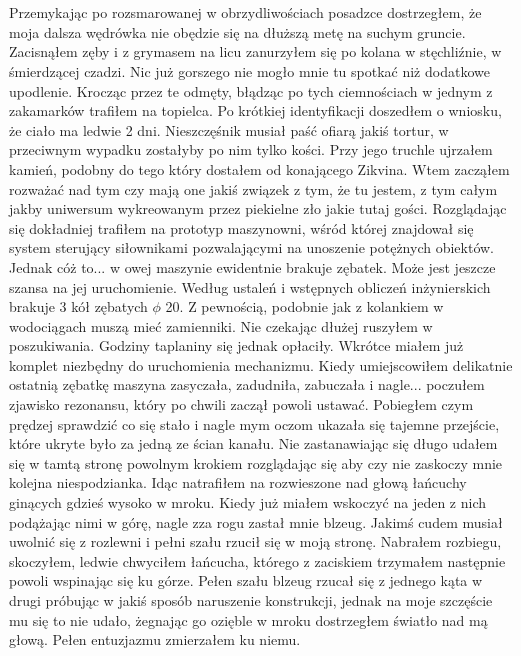 \documentclass[12pt,a4paper]{report}
\begin{document}
 \linebreak
 \\
 \\
Przemykając po rozsmarowanej w obrzydliwościach posadzce dostrzegłem, że moja dalsza wędrówka nie obędzie się na dłuższą metę na suchym gruncie. Zacisnąłem zęby i z grymasem na licu zanurzyłem się po kolana w stęchliźnie, w śmierdzącej czadzi. Nic już gorszego nie mogło mnie tu spotkać niż dodatkowe upodlenie. Krocząc przez te odmęty, błądząc po tych ciemnościach w jednym z zakamarków trafiłem na topielca. Po krótkiej identyfikacji doszedłem o wniosku, że ciało ma ledwie 2 dni. Nieszczęśnik musiał paść ofiarą jakiś tortur, w przeciwnym wypadku zostałyby po nim tylko kości. Przy jego truchle ujrzałem kamień, podobny do tego który dostałem od konającego Zikvina. Wtem zacząłem rozważać nad tym czy mają one jakiś związek z tym, że tu jestem, z tym całym jakby uniwersum wykreowanym przez piekielne zło jakie tutaj gości. Rozglądając się dokładniej trafiłem na prototyp maszynowni, wśród której znajdował się system sterujący siłownikami pozwalającymi na unoszenie potężnych obiektów. Jednak cóż to... w owej maszynie ewidentnie brakuje zębatek. Może jest jeszcze szansa na jej uruchomienie. Według ustaleń i wstępnych obliczeń inżynierskich brakuje 3 kół zębatych $ \phi $ 20. Z pewnością, podobnie jak z kolankiem w wodociągach muszą mieć zamienniki. Nie czekając dłużej ruszyłem w poszukiwania. Godziny taplaniny się jednak opłaciły. Wkrótce miałem już komplet niezbędny do uruchomienia mechanizmu. Kiedy umiejscowiłem delikatnie ostatnią zębatkę maszyna zasyczała, zadudniła, zabuczała i nagle... poczułem zjawisko rezonansu, który po chwili zaczął powoli ustawać. Pobiegłem czym prędzej sprawdzić co się stało i nagle mym oczom ukazała się tajemne przejście, które ukryte było za jedną ze ścian kanału. Nie zastanawiając się długo udałem się w tamtą stronę powolnym krokiem rozglądając się aby czy nie zaskoczy mnie kolejna niespodzianka.   Idąc natrafiłem na rozwieszone nad głową łańcuchy ginących gdzieś wysoko w mroku. Kiedy już miałem wskoczyć na jeden z nich podążając nimi w górę, nagle zza rogu zastał mnie blzeug. Jakimś cudem musiał uwolnić się z rozlewni i pełni szału rzucił się w moją stronę. Nabrałem rozbiegu, skoczyłem, ledwie chwyciłem łańcucha, którego z zaciskiem trzymałem następnie powoli wspinając się ku górze. Pełen szału blzeug rzucał się z jednego kąta w drugi próbując w jakiś sposób naruszenie konstrukcji, jednak na moje szczęście mu się to nie udało, żegnając go ozięble w mroku dostrzegłem światło nad mą głową. Pełen entuzjazmu zmierzałem ku niemu.
\end{document}
